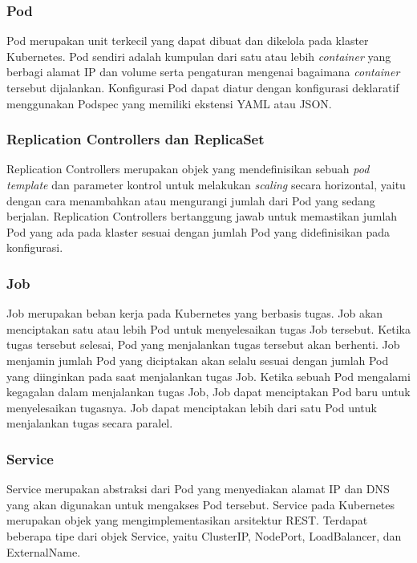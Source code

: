 \subsubsection{Pod}

Pod merupakan unit terkecil yang dapat dibuat dan dikelola pada klaster Kubernetes. Pod sendiri adalah
kumpulan dari satu atau lebih \emph{container} yang berbagi alamat IP dan volume serta
pengaturan mengenai bagaimana \emph{container} tersebut dijalankan. Konfigurasi Pod dapat
diatur dengan konfigurasi deklaratif menggunakan Podspec yang memiliki ekstensi YAML atau JSON.

\subsubsection{Replication Controllers dan ReplicaSet}

Replication Controllers merupakan objek yang mendefinisikan sebuah \emph{pod template}
dan parameter kontrol untuk melakukan \emph{scaling} secara horizontal, yaitu dengan
cara menambahkan atau mengurangi jumlah dari Pod yang sedang berjalan. Replication
Controllers bertanggung jawab untuk memastikan jumlah Pod yang ada pada klaster
sesuai dengan jumlah Pod yang didefinisikan pada konfigurasi.

\subsubsection{Job}

Job merupakan beban kerja pada Kubernetes yang berbasis tugas. Job akan menciptakan
satu atau lebih Pod untuk menyelesaikan tugas Job tersebut. Ketika tugas tersebut
selesai, Pod yang menjalankan tugas tersebut akan berhenti. Job menjamin jumlah
Pod yang diciptakan akan selalu sesuai dengan jumlah Pod yang diinginkan pada
saat menjalankan tugas Job. Ketika sebuah Pod mengalami kegagalan dalam menjalankan
tugas Job, Job dapat menciptakan Pod baru untuk menyelesaikan tugasnya. Job dapat
menciptakan lebih dari satu Pod untuk menjalankan tugas secara paralel.

\subsubsection{Service}

Service merupakan abstraksi dari Pod yang menyediakan alamat IP dan DNS yang
akan digunakan untuk mengakses Pod tersebut. Service pada Kubernetes merupakan
objek yang mengimplementasikan arsitektur REST. Terdapat beberapa tipe dari objek
Service, yaitu ClusterIP, NodePort, LoadBalancer, dan ExternalName.

